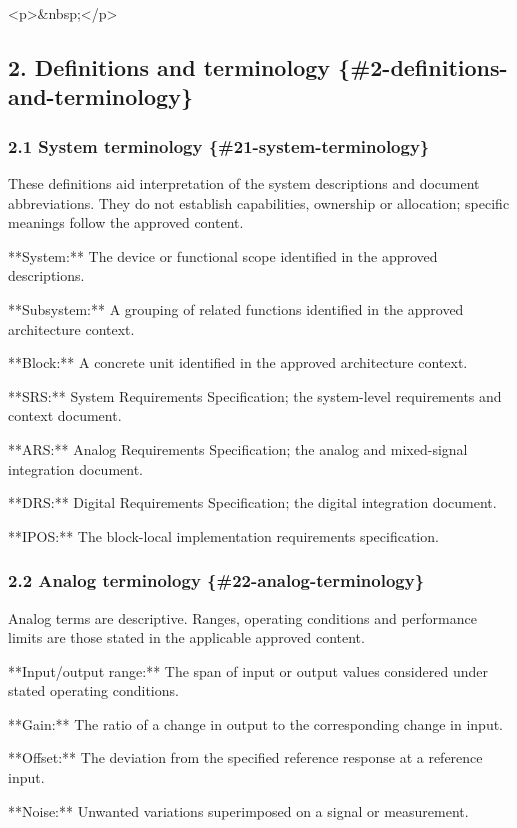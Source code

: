 \documentclass[11pt]{article}
\begin{document}
<p>\&nbsp;</p>

\subsection{2. Definitions and terminology \{\#2-definitions-and-terminology\}}


\subsubsection{2.1 System terminology \{\#21-system-terminology\}}


These definitions aid interpretation of the system descriptions and document abbreviations. They do not establish capabilities, ownership or allocation; specific meanings follow the approved content.

**System:** The device or functional scope identified in the approved descriptions.

**Subsystem:** A grouping of related functions identified in the approved architecture context.

**Block:** A concrete unit identified in the approved architecture context.

**SRS:** System Requirements Specification; the system-level requirements and context document.

**ARS:** Analog Requirements Specification; the analog and mixed-signal integration document.

**DRS:** Digital Requirements Specification; the digital integration document.

**IPOS:** The block-local implementation requirements specification.

\subsubsection{2.2 Analog terminology \{\#22-analog-terminology\}}


Analog terms are descriptive. Ranges, operating conditions and performance limits are those stated in the applicable approved content.

**Input/output range:** The span of input or output values considered under stated operating conditions.

**Gain:** The ratio of a change in output to the corresponding change in input.

**Offset:** The deviation from the specified reference response at a reference input.

**Noise:** Unwanted variations superimposed on a signal or measurement.
\end{document}
